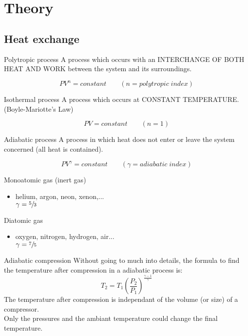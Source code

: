 \documentclass[aspectratio=1610,english,12pt]{beamer}
\begin{document}
\section{Theory}

\subsection{Heat exchange}
	\begin{frame}{Polytropic process}
		A process which occurs with an INTERCHANGE OF BOTH HEAT AND WORK between the system and its surroundings.\par
		\[ \boxed{PV^n=constant}	 \qquad (n=polytropic \; index)\]
	\end{frame}

	\begin{frame}{Isothermal process}
		A process which occurs at CONSTANT TEMPERATURE.\\
		(Boyle-Mariotte's Law) \par
		\[ \boxed{PV=constant} \qquad (n=1)\]
	\end{frame}

	\begin{frame}{Adiabatic process}
		A process in which heat does not enter or leave the system concerned (all heat is contained).\par
		\[ \boxed{PV^{\gamma}=constant} \qquad (\gamma=adiabatic \; index) \]

		\vspace{1cm}
				
		Monoatomic gas (inert gas)
		\begin{itemize}
			\item helium, argon, neon, xenon,...\\ $\gamma = \sfrac{5}{3}$   
		\end{itemize}
		Diatomic gas
		\begin{itemize}
			\item oxygen, nitrogen, hydrogen, air...\\ $\gamma = \sfrac{7}{5}$ 
		\end{itemize}
	\end{frame}

	\begin{frame}{Adiabatic compression}
		Without going to much into details, the formula to find the temperature after compression in a adiabatic process is:
		\[ \boxed{ T_2 = T_1 \left( \frac{P_2}{P_1} \right) ^{\frac{\gamma-1}{\gamma}} }\]
		The temperature after compression is independant of the volume (or size) of a compressor.\\Only the pressures and the ambiant temperature could change the final temperature.
	\end{frame}
\end{document}
